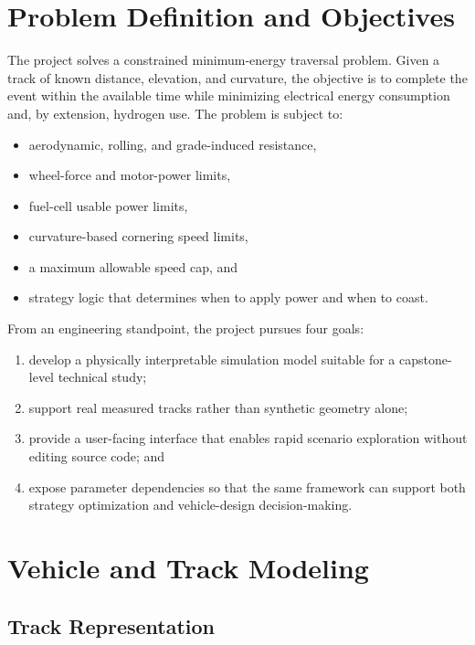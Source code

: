 \documentclass[11pt]{article}
\begin{document}
\section{Problem Definition and Objectives}

The project solves a constrained minimum-energy traversal problem. Given a track of known distance, elevation, and curvature, the objective is to complete the event within the available time while minimizing electrical energy consumption and, by extension, hydrogen use. The problem is subject to:

\begin{itemize}[leftmargin=1.5em]
\item aerodynamic, rolling, and grade-induced resistance,
\item wheel-force and motor-power limits,
\item fuel-cell usable power limits,
\item curvature-based cornering speed limits,
\item a maximum allowable speed cap, and
\item strategy logic that determines when to apply power and when to coast.
\end{itemize}

From an engineering standpoint, the project pursues four goals:

\begin{enumerate}[leftmargin=1.5em]
\item develop a physically interpretable simulation model suitable for a capstone-level technical study;
\item support real measured tracks rather than synthetic geometry alone;
\item provide a user-facing interface that enables rapid scenario exploration without editing source code; and
\item expose parameter dependencies so that the same framework can support both strategy optimization and vehicle-design decision-making.
\end{enumerate}

\section{Vehicle and Track Modeling}

\subsection{Track Representation}
\end{document}
